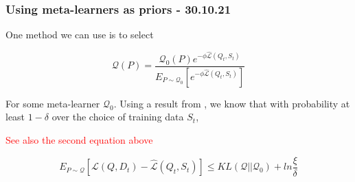 \documentclass[letterpaper]{article}
\theoremstyle{definition}
\begin{document}
%
%
%
%
%
%
%
%

\subsubsection{Using meta-learners as priors - 30.10.21}

One method we can use is to select 

$$ \mathcal{Q}(P) = \frac{\mathcal{Q}_0(P)e^{-\phi \hat{\mathcal{L}}(Q_t, S_t)}}{E_{P\sim \mathcal{Q}_0} \left [e^{-\phi \hat{\mathcal{L}}(Q_t, S_t)}\right ]}$$

For some meta-learner $\mathcal{Q}_0$.
Using a result from \cite{Rivasplata2020}, we know that with probability at least $1-\delta$ over the choice of training data $S_t$,

\textcolor{red}{See also the second equation above}

$$ E_{P\sim \mathcal{Q}} \left [\mathcal{L}(Q, D_t) - \hat{\mathcal{L}}(Q_t, S_t) \right ] \leq KL(\mathcal{Q}||\mathcal{Q}_0) + ln\frac{\xi}{\delta} $$
\end{document}
